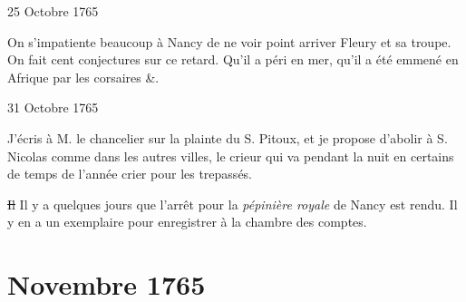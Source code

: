                      \begin{diary}{25 Octobre 1765}{}

                         On s'impatiente beaucoup à
                              Nancy de ne
                           voir point arriver Fleury et sa
                           troupe. On
                           fait cent conjectures sur ce retard. Qu'il
                           a péri en mer, qu'il a été emmené en Afrique
                           par les corsaires \&. \bigskip


                     \end{diary}

                     \begin{diary}{31 Octobre 1765}{}

                         J'écris à M. le chancelier sur la plainte
                           du S. Pitoux, et je propose
                           d'abolir à S.
                              Nicolas comme dans les autres villes, le
                           crieur qui va pendant la
                           nuit en certains
                           de temps de l'année crier pour les trepassés. \bigskip



                           \sout{Il} Il y a quelques jours que l'arrêt pour
                              la
                              \emph{pépinière royale} de Nancy est rendu. Il y
                           en a un exemplaire pour enregistrer à la
                              chambre des comptes. \bigskip


                     \end{diary}
                  \chapter*{Novembre 1765}




